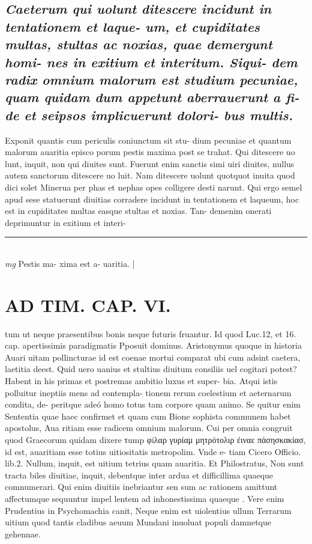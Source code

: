 \documentclass{article}
\begin{document}
\begin{pages}
\subsection*{\textit{Caeterum qui uolunt ditescere incidunt in tentationem et laque- um, et cupiditates multas, stultas ac noxias, quae demergunt homi- nes in exitium et interitum. Siqui- dem radix omnium malorum est studium pecuniae, quam quidam dum appetunt aberrauerunt a fi- de et seipsos implicuerunt dolori- bus multis. }}\pstart Exponit quantis cum periculis coniunctum sit stu- dium pecuniae et quantum malorum auaritia episco porum pestis maxima post se trahat. Qui ditescere uo lunt, inquit, non qui diuites sunt. Fuerunt enim sanctis simi uiri diuites, nullus autem sanctorum ditescere uo luit. Nam ditescere uolunt quotquot inuita quod dici solet Minerua per phas et nephas opes colligere desti narunt. Qui ergo semel apud sese statuerunt diuitias corradere incidunt in tentationem et laqueum, hoc est in cupiditates multas easque stultas et noxias. Tan- demenim onerati deprimuntur in exitium et interi-  \pend
\vspace{0.5cm}\noindent
\vspace{0.2cm}\rule{1cm}{0.2pt}\\ 
\hspace{0.2cm}\textit{mg}
\footnotesize Pestis ma- xima est a- uaritia. 
\normalsize| 
\section*{AD TIM. CAP. VI. }
\marginpar{[ p.169 ]}\pstart tum ut neque praesentibus bonis neque futuris fruantur. Id quod Luc.12, et 16. cap. apertissimis paradigmatis Pposuit dominus. Aristonymus quoque in historia Auari uitam pollincturae id est coenae mortui comparat ubi cum adsint caetera, laetitia deest. Quid uero uanius et stultius diuitum consiliis uel cogitari potest? Habent in his primas et postremas ambitio luxus et super- bia. Atqui istis polluitur ineptiis mens ad contempla- tionem rerum coelestium et aeternarum condita, de- peritque adeó homo totus tam corpore quam animo. Se quitur enim Sententia quae haec confirmet et quam cum Bione sophista communem habet apostolus, Aua ritiam esse radicem omnium malorum. Cui per omnia congruit quod Graecorum quidam dixere τump φiλαρ γυρίαμ μητρότολιρ ἐιναε πἀσησκακίασ, id est, auaritiam esse totius uitiositatis metropolim. Vnde e- tiam Cicero Officio. lib.2. Nullum, inquit, est uitium tetrius quam auaritia. Et Philostratus, Non sunt tracta biles diuitiae, inquit, debentque inter ardua et difficillima quaeque comnumerari. Qui enim diuitiis inebriantur sen sum ac rationem amittunt affectumque sequuntur impel lentem ad inhonestissima quaeque . Vere enim Prudentius in Psychomachia canit,  \pend\pstart Neque enim est uiolentius ullum Terrarum uitium quod tantis cladibus aeuum Mundani inuoluat populi damnetque gehennae.  \pend

\end{pages}
\end{document}
